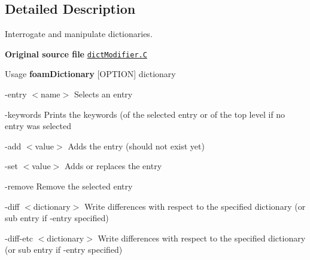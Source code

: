 \subsection{Detailed Description}
Interrogate and manipulate dictionaries. 

{\bfseries Original source file} \href{../../../home/carlo/data/GeN-Foam/GeN-Foam_ffn/GeN-Foam/GeN-Foam/FMU4FOAM/application/tools/dictModifier/dictModifier.C}{\tt dict\+Modifier.\+C}

\label{_Description}%
 \begin{DoxyParagraph}{Usage}
{\bfseries foam\+Dictionary} \mbox{[}O\+P\+T\+I\+ON\mbox{]} dictionary
\end{DoxyParagraph}

\begin{DoxyItemize}
\item \begin{DoxyParagraph}{-\/entry $<$name$>$}
Selects an entry
\end{DoxyParagraph}

\item \begin{DoxyParagraph}{-\/keywords}
Prints the keywords (of the selected entry or of the top level if no entry was selected
\end{DoxyParagraph}

\item \begin{DoxyParagraph}{-\/add $<$value$>$}
Adds the entry (should not exist yet)
\end{DoxyParagraph}

\item \begin{DoxyParagraph}{-\/set $<$value$>$}
Adds or replaces the entry
\end{DoxyParagraph}

\item \begin{DoxyParagraph}{-\/remove}
Remove the selected entry
\end{DoxyParagraph}

\item \begin{DoxyParagraph}{-\/diff $<$dictionary$>$}
Write differences with respect to the specified dictionary (or sub entry if -\/entry specified)
\end{DoxyParagraph}

\item \begin{DoxyParagraph}{-\/diff-\/etc $<$dictionary$>$}
Write differences with respect to the specified dictionary (or sub entry if -\/entry specified)
\end{DoxyParagraph}


\end{DoxyItemize}
